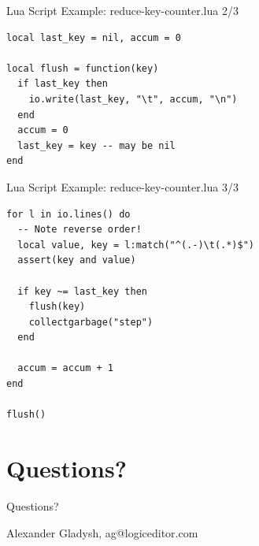 \documentclass[handout]{beamer}
\begin{document}

\begin{frame}[fragile]{Lua Script Example: reduce-key-counter.lua 2/3}

\begin{verbatim}
local last_key = nil, accum = 0

local flush = function(key)
  if last_key then
    io.write(last_key, "\t", accum, "\n")
  end
  accum = 0
  last_key = key -- may be nil
end
\end{verbatim}

\end{frame}


\begin{frame}[fragile]{Lua Script Example: reduce-key-counter.lua 3/3}

\begin{verbatim}
for l in io.lines() do
  -- Note reverse order!
  local value, key = l:match("^(.-)\t(.*)$")
  assert(key and value)

  if key ~= last_key then
    flush(key)
    collectgarbage("step")
  end

  accum = accum + 1
end

flush()
\end{verbatim}

\end{frame}


\section{Questions?}


\begin{frame}{Questions?}

Alexander Gladysh,
ag@logiceditor.com

\end{frame}

\end{document}
